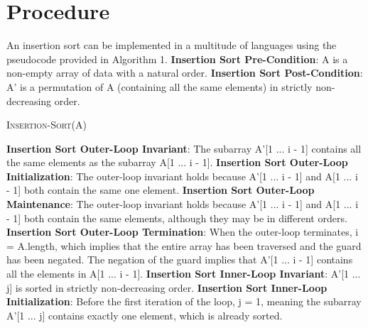 \documentclass[onecolumn, 12pt, article]{IEEEtran}
\numberwithin{case}{problem}
\numberwithin{condition}{problem}
\numberwithin{condition}{subsection}
\numberwithin{definition}{section}
\theoremstyle{remark}
\numberwithin{question}{problem}
\theoremstyle{plain}
\numberwithin{answer}{problem}
\numberwithin{solution}{section}
\numberwithin{equation}{section}%
\begin{document}
\section{Procedure}
An insertion sort can be implemented in a multitude of languages using the pseudocode provided in Algorithm 1.
\newline
\textbf{Insertion Sort Pre-Condition}: A is a non-empty array of data with a natural order.
\newline
\textbf{Insertion Sort Post-Condition}: A' is a permutation of A (containing all the same elements) in strictly non-decreasing order.
\begin{algorithm}
\caption {\textsc{Insertion-Sort}(A)}
\label{algo:insertionsort}
\begin{algorithmic}[1]
\EndIf
{}
	\EndWhile
\EndWhile
{}
\EndProcedure
\end{algorithmic}
\end{algorithm}
\newline
\textbf{Insertion Sort Outer-Loop Invariant}: The subarray A'[1 ... i - 1] contains all the same elements as the subarray A[1 ... i - 1].
\newline 
\textbf{Insertion Sort Outer-Loop Initialization}: The outer-loop invariant holds because A'[1 ... i - 1] and A[1 ... i - 1] both contain the same one element.
\newline
\textbf{Insertion Sort Outer-Loop Maintenance}: The outer-loop invariant holds because A'[1 ... i - 1] and A[1 ... i - 1] both contain the same elements, although they may be in different orders.
\newline
\textbf{Insertion Sort Outer-Loop Termination}: When the outer-loop terminates, i = A.length, which implies that the entire array has been traversed and the guard has been negated. The negation of the guard implies that A'[1 ... i - 1] contains all the elements in A[1 ... i - 1].
\newline
\newline
\textbf{Insertion Sort Inner-Loop Invariant}: A'[1 ... j] is sorted in strictly non-decreasing order.
\newline
\textbf{Insertion Sort Inner-Loop Initialization}: Before the first iteration of the loop, j = 1, meaning the subarray A'[1 ... j] contains exactly one element, which is already sorted.
\end{document}
